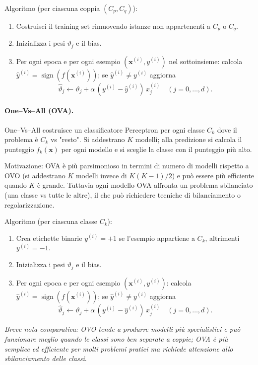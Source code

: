 \noindent
Algoritmo (per ciascuna coppia $(C_p,C_q)$):
\begin{enumerate}
  \item Costruisci il training set rimuovendo istanze non appartenenti a $C_p$ o $C_q$.
  \item Inizializza i pesi $\vartheta_j$ e il bias.
  \item Per ogni epoca e per ogni esempio $(\mathbf{x}^{(i)},y^{(i)})$ nel sottoinsieme: calcola $\hat{y}^{(i)}=\operatorname{sign}(f(\mathbf{x}^{(i)}))$; se $\hat{y}^{(i)}\neq y^{(i)}$ aggiorna
  \[\hat{\vartheta}_j\leftarrow\vartheta_j+\alpha\,(y^{(i)}-\hat{y}^{(i)})\,x_j^{(i)}\quad(j=0,\dots,d).\]
\end{enumerate}

\paragraph{One–Vs–All (OVA).}
One–Vs–All costruisce un classificatore Perceptron per ogni classe $C_k$ dove il problema è $C_k$ vs "resto". Si addestrano $K$ modelli; alla predizione si calcola il punteggio $f_k(\mathbf{x})$ per ogni modello e si sceglie la classe con il punteggio più alto.

Motivazione: OVA è più parsimonioso in termini di numero di modelli rispetto a OVO (si addestrano $K$ modelli invece di $K(K-1)/2$) e può essere più efficiente quando $K$ è grande. Tuttavia ogni modello OVA affronta un problema sbilanciato (una classe vs tutte le altre), il che può richiedere tecniche di bilanciamento o regolarizzazione.

\noindent
Algoritmo (per ciascuna classe $C_k$):
\begin{enumerate}
  \item Crea etichette binarie $y^{(i)}=+1$ se l'esempio appartiene a $C_k$, altrimenti $y^{(i)}=-1$.
  \item Inizializza i pesi $\vartheta_j$ e il bias.
  \item Per ogni epoca e per ogni esempio $(\mathbf{x}^{(i)},y^{(i)})$: calcola $\hat{y}^{(i)}=\operatorname{sign}(f(\mathbf{x}^{(i)}))$; se $\hat{y}^{(i)}\neq y^{(i)}$ aggiorna
  \[\hat{\vartheta}_j\leftarrow\vartheta_j+\alpha\,(y^{(i)}-\hat{y}^{(i)})\,x_j^{(i)}\quad(j=0,\dots,d).\]
\end{enumerate}

\noindent
\textit{Breve nota comparativa: OVO tende a produrre modelli più specialistici e può funzionare meglio quando le classi sono ben separate a coppie; OVA è più semplice ed efficiente per molti problemi pratici ma richiede attenzione allo sbilanciamento delle classi}.

